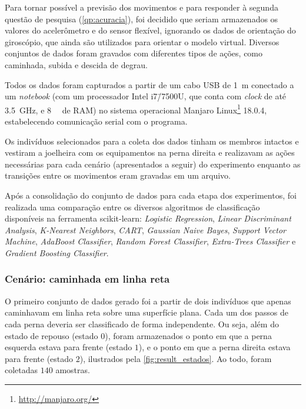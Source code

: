 Para tornar possível a previsão dos movimentos e para responder à segunda questão de pesquisa (\ref{qp:acuracia}), foi decidido que seriam armazenados os valores do acelerômetro e do sensor flexível, ignorando os dados de orientação do giroscópio, que ainda são utilizados para orientar o modelo virtual. Diversos conjuntos de dados foram gravados com diferentes tipos de ações, como caminhada, subida e descida de degrau.

Todos os dados foram capturados a partir de um cabo USB de \SI{1}{\meter} conectado a um \textit{notebook} (com um processador Intel i7\=/7500U, que conta com \textit{clock} de até \SI{3.5}{\giga\hertz}, e \SI{8}{\giga\byte} de RAM) no sistema operacional Manjaro Linux\footnote{\url{http://manjaro.org/}} 18.0.4, estabelecendo comunicação serial com o programa.

Os indivíduos selecionados para a coleta dos dados tinham os membros intactos e vestiram a joelheira com os equipamentos na perna direita e realizavam as ações necessárias para cada cenário (apresentados a seguir) do experimento enquanto as transições entre os movimentos eram gravadas em um arquivo.

Após a consolidação do conjunto de dados para cada etapa dos experimentos, foi realizada uma comparação entre os diversos algoritmos de classificação disponíveis na ferramenta scikit-learn: \textit{Logistic Regression}\cite{scikit:lr}, \textit{Linear Discriminant Analysis}\cite{scikit:lda}, \textit{K-Nearest Neighbors}\cite{scikit:knn}, \textit{CART}\cite{scikit:cart}, \textit{Gaussian Naive Bayes}\cite{scikit:nb}, \textit{Support Vector Machine}\cite{scikit:svm}, \textit{AdaBoost Classifier}\cite{scikit:adb}, \textit{Random Forest Classifier}\cite{scikit:rfc}, \textit{Extra-Trees Classifier}\cite{scikit:etc} e \textit{Gradient Boosting Classifier}\cite{scikit:gbc}.

\subsubsection{Cenário: caminhada em linha reta}

O primeiro conjunto de dados gerado foi a partir de dois indivíduos que apenas caminhavam em linha reta sobre uma superfície plana. Cada um dos passos de cada perna deveria ser classificado de forma independente. Ou seja, além do estado de repouso (estado $0$), foram armazenados o ponto em que a perna esquerda estava para frente (estado $1$), e o ponto em que a perna direita estava para frente (estado $2$), ilustrados pela \autoref{fig:result_estados}. Ao todo, foram coletadas $140$ amostras.

